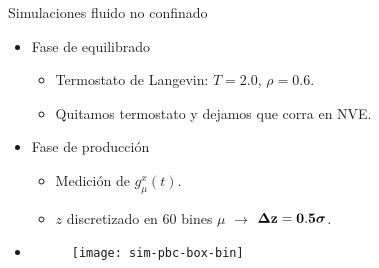 \documentclass{beamer}
\begin{document}
\begin{frame}{Simulaciones fluido no confinado}
   \begin{itemize}
     \item<1-> Fase de \alert{equilibrado}
       \begin{itemize}
         \item Termostato de Langevin: $T=2.0$, $\rho=0.6$.
         \item Quitamos termostato y dejamos que corra en NVE.
          \end{itemize}
        \item<2-> Fase de \alert{producción}
       \begin{itemize}
         \item Medición de $g_{\mu}^x(t)$.
         \item $z$ discretizado en $60$ bines $\mu$ $\rightarrow$ {$\boldsymbol{\Delta} {\bf z=0.5}\boldsymbol{\sigma}$}.
         \end{itemize}
       \item<2->[]\begin{figure}
    \texttt{[image: sim-pbc-box-bin]}
  \end{figure}
     \end{itemize}
 \end{frame}

\end{document}
